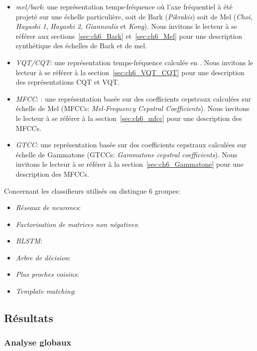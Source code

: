 \begin{itemize}
\item \emph{mel/bark}: une représentation temps-fréquence où l'axe fréquentiel à été projeté sur une échelle particulière, soit de Bark (\emph{Pikrakis}) soit de Mel (\emph{Choi}, \emph{Hayashi 1}, \emph{Hayashi 2}, \emph{Giannoulis} et \emph{Kong}). Nous invitons le lecteur à se référer aux sections~\ref{sec:ch6_Bark} et~\ref{sec:ch6_Mel} pour une description synthétique des échelles de Bark et de mel.
\item \emph{VQT/CQT}: une représentation temps-fréquence calculée en . Nous invitons le lecteur à se référer à la section~\ref{sec:ch6_VQT_CQT} pour une description des représentations CQT et VQT.
\item \emph{MFCC}: : une représentation basée sur des coefficients cepstraux calculées sur échelle de Mel (MFCCs: \emph{Mel-Frequency Cepstral Coefficients}). Nous invitons le lecteur à se référer à la section~\ref{sec:ch6_mfcc} pour une description des MFCCs.
\item \emph{GTCC}: une représentation basée sur des coefficients cepstraux calculées sur échelle de Gammatone (GTCCs: \emph{Gammatone cepstral coefficients}). Nous invitons le lecteur à se référer à la section~\ref{sec:ch6_Gammatone} pour une description des MFCCs.
\end{itemize}

Concernant les classifieurs utilisés on distingue 6 groupes:

\begin{itemize}
\item \emph{Réseaux de neurones}:
\item \emph{Factorisation de matrices non négatives}:
\item \emph{BLSTM}:
\item \emph{Arbre de décision}:
\item \emph{Plus proches voisins}:
\item \emph{Template matching}:
\end{itemize}




\subsection{Résultats}

\subsubsection{Analyse globaux}
\label{sec:ch7_analyseGlobaleDcase2016}

